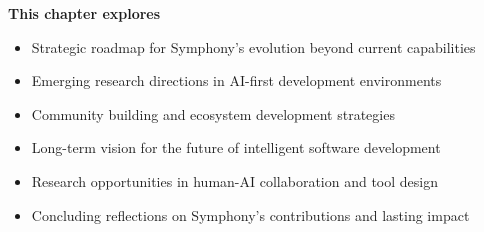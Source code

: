 \begin{tcolorbox}[
    enhanced,
    colback=white,
    colframe=brandPrimary!40,
    boxrule=1pt,
    arc=12pt,
    drop shadow={brandPrimary!20},
    left=1.5cm,
    right=1.5cm,
    top=1.2cm,
    bottom=1.2cm,
    before upper={\parindent0pt}
]
\begin{center}
{\Large\textbf{\textcolor{brandPrimary}{This chapter explores}}}
\end{center}

\vspace{0.8cm}

\begin{itemize}[leftmargin=1.2cm, itemsep=0.4cm, label={\textcolor{brandAccent}{$\triangleright$}}]
    \item {\large Strategic roadmap for Symphony's evolution beyond current capabilities}
    \item {\large Emerging research directions in AI-first development environments}
    \item {\large Community building and ecosystem development strategies}
    \item {\large Long-term vision for the future of intelligent software development}
    \item {\large Research opportunities in human-AI collaboration and tool design}
    \item {\large Concluding reflections on Symphony's contributions and lasting impact}
\end{itemize}
\end{tcolorbox}

\clearpage
